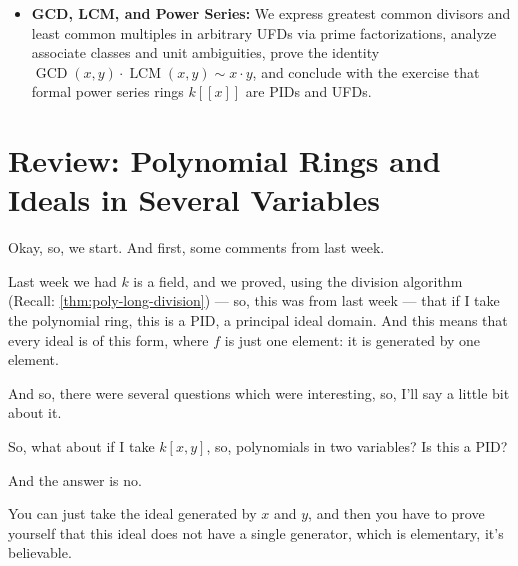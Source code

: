 \begin{overview}
\begin{itemize}
\begin{description}
    \end{description}
    \item \textbf{GCD, LCM, and Power Series:} We express greatest common divisors and least common multiples in arbitrary UFDs via prime factorizations, analyze associate classes and unit ambiguities, prove the identity $\operatorname{GCD}(x, y) \cdot \operatorname{LCM}(x, y) \sim x \cdot y$, and conclude with the exercise that formal power series rings $k[[x]]$ are PIDs and UFDs.
\end{itemize}
\end{overview}

\section{Review: Polynomial Rings and Ideals in Several Variables}

\begin{speech}[00:00:00 - 00:01:19]
Okay, so, we start. And first, some comments from last week.

Last week we had $k$ is a field,  and we proved, using the division algorithm (Recall: \cref{thm:poly-long-division}) --- so, this was from last week --- that if I take the polynomial ring, this is a PID,  a principal ideal domain. And this means that  every ideal  is of this form, where $f$ is just one element: it is generated by one element.

And so, there were several questions which were interesting, so, I'll say a little bit about it.

So, what about  if I take $k[x, y]$,  so, polynomials in two variables? Is this a PID? 

And the answer is no. 

You can just take the ideal generated by $x$ and $y$,  and then you have to prove yourself that this ideal does not have a single generator, which is elementary, it's believable.
\end{speech}

\begin{content}
\end{content}

